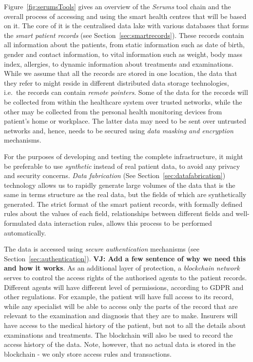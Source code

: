 \noindent Figure~\ref{fig:serumsTools} gives an overview of the \emph{Serums} tool chain and the overall process of accessing and using the smart health centres that will be based on it. The core of it is the centralised data lake with various databases that forms the \emph{smart patient records} (see Section~\ref{sec:smartrecords}). These records contain all information about the patients, from static information such as date of birth, gender and contact information, to vital information such as weight, body mass index, allergies, to dynamic information about treatments and examinations. While we assume that all the records are stored in one location, the data that they refer to might reside in different distributed data storage technologies, i.e.~the records can contain \emph{remote pointers}. Some of the data for the records will be collected from within the healthcare system over trusted networks, while the other may be collected from the personal health monitoring devices from patient's home or workplace. The latter data may need to be sent over untrusted networks and, hence, needs to be secured using \emph{data masking and encryption} mechanisms.

For the purposes of developing and testing the complete infrastructure, it might be preferable to use \emph{synthetic} instead of real patient data, to avoid any privacy and security concerns. \emph{Data fabrication} (See Section~\ref{sec:datafabrication}) technology allows us to rapidly generate large volumes of the data that is the same in terms structure as the real data, but the fields of which are synthetically generated. The strict format of the smart patient records, with formally defined rules about the values of each field, relationships between different fields and well-formulated data interaction rules, allows this process to be performed automatically. 

The data is accessed using \emph{secure authentication} mechanisms (see Section~\ref{sec:authentication}). \textbf{VJ: Add a few sentence of why we need this and how it works}. As an additional layer of protection, a \emph{blockchain network} serves to control the access rights of the authorised agents to the patient records. Different agents will have different level of permissions, according to GDPR and other regulations. For example, the patient will have full access to its record, while any specialist will be able to access only the parts of the record that are relevant to the examination and diagnosis that they are to make. Insurers will have access to the medical history of the patient, but not to all the details about examinations and treatments. The blockchain will also be used to record the access history of the data. Note, however, that no actual data is stored in the blockchain - we only store access rules and transactions.

